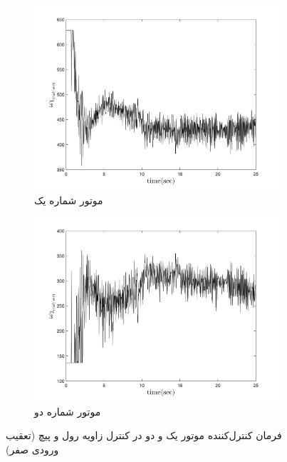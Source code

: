 \begin{figure}
	[width=12cm]
	\centering
	\begin{subfigure}
		\centering
		\includegraphics[width=12cm]{../Figures/Calibration/LQIDG/3DOF/lqidg_Omega_1.png}
		\caption{موتور شماره یک}
	\end{subfigure}
	\begin{subfigure}
	\centering
	\includegraphics[width=12cm]{../Figures/Calibration/LQIDG/3DOF/lqidg_Omega_2.png}
	\caption{موتور شماره دو}
\end{subfigure}
	\caption{‫‪فرمان کنترل‌کننده موتور یک و دو در کنترل زاویه رول و پیچ (تعقیب ورودی صفر)}
\end{figure}


